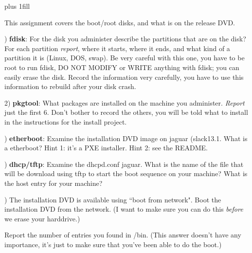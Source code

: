 
\rightskip=0pt plus 1fill

\parindent 0pt

This assignment covers the boot/root disks, and what is on the release DVD.

) {\bf fdisk}:
For the disk you administer describe the partitions that are on the disk?
For each partition {\it report}, where it starts, where it ends, and what kind
of a partition it is (Linux, DOS, swap).
Be very careful with this one, you have to be root to run fdisk,
DO NOT MODIFY or WRITE anything with fdisk; 
you can easily erase the disk.
Record the information very carefully, you have to use this information
to rebuild after your disk crash.

2) {\bf pkgtool}:
What packages are installed on the machine you administer.
{\it Report} just the first 6. Don't bother to record the others, you will
be told what to install in the instructions for the install project.

) {\bf etherboot}:
Examine the installation DVD image  on {\ltt{}jaguar} ({\ltt{}slack13.1}.
What is a {\ltt{}etherboot}?
Hint 1: it's a PXE installer.
Hint 2: see the README.

) {\bf dhcp/tftp}:
Examine the {\ltt{}dhcpd.conf} {\ltt{}jaguar}.
What is the name of the file that will be download using tftp to
start the boot sequence on your machine?
What is the host entry for your machine?

) The installation DVD is available using ``boot from network".
Boot the installation DVD from the network. (I want to make sure
you can do this {\it before} we erase your harddrive.)

Report the number of entries you found in {\ltt{}/bin}.
(This answer doesn't have any importance, it's just to make sure
that you've been able to do the boot.)

\bye
